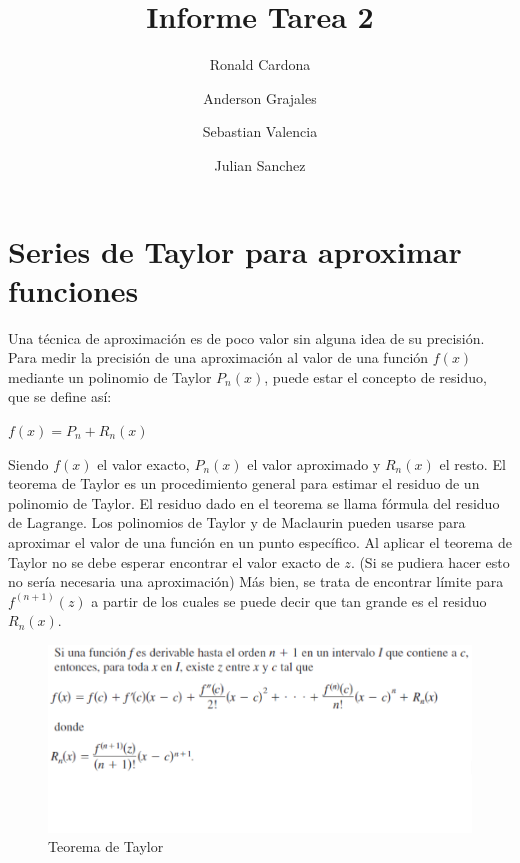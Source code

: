 \documentclass[12pt]{article}
\title{Informe Tarea 2}
\author {Ronald Cardona
\and Anderson Grajales
\and Sebastian Valencia
\and Julian Sanchez}
\begin{document}
    
    \maketitle

    
    
    \section{Series de Taylor para aproximar funciones}
    Una técnica de aproximación es de poco valor sin alguna idea de su precisión.
    Para medir la precisión de una aproximación al valor de una función $f(x)$ mediante 
    un polinomio de Taylor $P_{n}(x)$, puede estar el concepto de residuo, que se define así:

    \begin{center}
        \begin{math}
            f(x) = P_{n} + R_{n}(x)
        \end{math}
    \end{center}

    Siendo $f(x)$ el valor exacto, $P_{n}(x)$ el valor aproximado y $R_{n}(x)$ el resto. El teorema
    de Taylor es un procedimiento general para estimar el residuo de un polinomio de Taylor. El residuo
    dado en el teorema se llama fórmula del residuo de Lagrange.
    Los polinomios de Taylor y de Maclaurin pueden usarse para aproximar el valor de una función en un
    punto específico. Al aplicar el teorema de Taylor no se debe esperar encontrar el valor exacto de $z$.
    (Si se pudiera hacer esto no sería necesaria una aproximación) Más bien, se trata de encontrar límite
    para $f^{(n+1)}(z)$ a partir de los cuales se puede decir que tan grande es el residuo $R_{n}(x)$.

    \begin {figure}[h!] 
      \includegraphics[width=\linewidth]{teorema_taylor.png}
      \caption {Teorema de Taylor}
      \label {fig:teorema_taylor}
    \end{figure}
    
\end{document}
